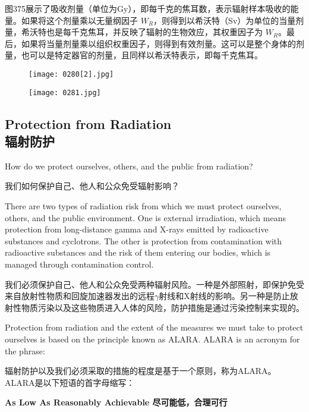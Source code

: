 \documentclass[dvipsnames, svgnames,a4paper,11pt]{article}
\begin{document}
图375展示了吸收剂量（单位为Gy），即每千克的焦耳数，表示辐射样本吸收的能量。如果将这个剂量乘以无量纲因子 \(W_R\)，则得到以希沃特（Sv）为单位的当量剂量，希沃特也是每千克焦耳，并反映了辐射的生物效应，其权重因子为 \(W_R\)。最后，如果将当量剂量乘以组织权重因子，则得到有效剂量。这可以是整个身体的剂量，也可以是特定器官的剂量，且同样以希沃特表示，即每千克焦耳。

\begin{figure}[h]
    \centering
    \texttt{[image: 0280[2].jpg]}  
     \label{fig374}
\end{figure}

\begin{figure}[H]
    \centering
    \texttt{[image: 0281.jpg]}  
     \label{fig375}
\end{figure}

\subsection{Protection from Radiation \\辐射防护}

How do we protect ourselves, others, and the public from radiation?

我们如何保护自己、他人和公众免受辐射影响？

There are two types of radiation risk from which we must protect ourselves, others, and the public environment. One is external irradiation, which means protection from long-distance gamma and X-rays emitted by radioactive substances and cyclotrons. The other is protection from contamination with radioactive substances and the risk of them entering our bodies, which is managed through contamination control.

我们必须保护自己、他人和公众免受两种辐射风险。一种是外部照射，即保护免受来自放射性物质和回旋加速器发出的远程$\gamma$射线和X射线的影响。另一种是防止放射性物质污染以及这些物质进入人体的风险，防护措施是通过污染控制来实现的。

Protection from radiation and the extent of the measures we must take to protect ourselves is based on the principle known as ALARA. ALARA is an acronym for the phrase:

辐射防护以及我们必须采取的措施的程度是基于一个原则，称为ALARA。ALARA是以下短语的首字母缩写：
\begin{center}
      \textbf{As Low As Reasonably Achievable 尽可能低，合理可行}
\end{center}
\end{document}
